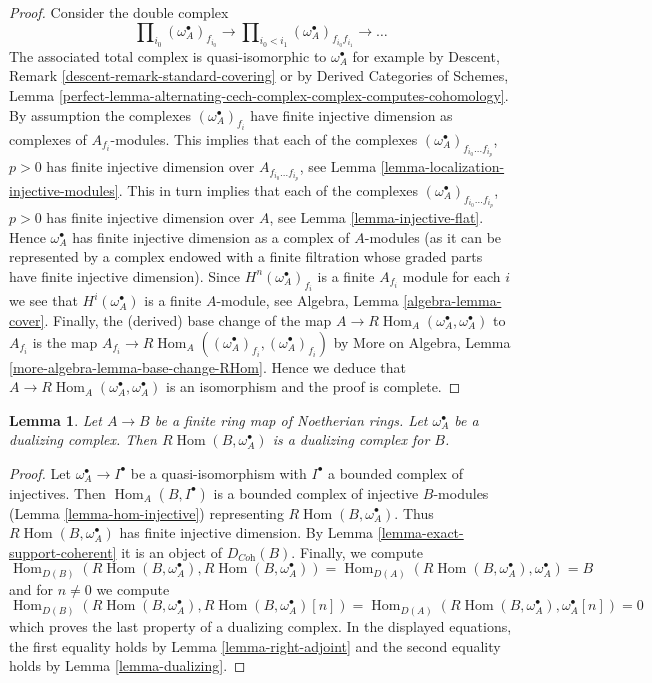 \documentclass{stacks-project}
\theoremstyle{plain}
\newtheorem{lemma}[subsection]{Lemma}
\theoremstyle{definition}
\theoremstyle{remark}
\numberwithin{equation}{subsection}
\def\Hom{\mathop{\mathrm{Hom}}\nolimits}
\begin{document}
\begin{proof}
Consider the double complex
$$
\prod\nolimits_{i_0} (\omega_A^\bullet)_{f_{i_0}}
\to
\prod\nolimits_{i_0 < i_1} (\omega_A^\bullet)_{f_{i_0}f_{i_1}}
\to \ldots
$$
The associated total complex is quasi-isomorphic to $\omega_A^\bullet$
for example by Descent, Remark \ref{descent-remark-standard-covering}
or by
Derived Categories of Schemes, Lemma
\ref{perfect-lemma-alternating-cech-complex-complex-computes-cohomology}.
By assumption the complexes $(\omega_A^\bullet)_{f_i}$ have
finite injective dimension as complexes of $A_{f_i}$-modules.
This implies that each of the complexes
$(\omega_A^\bullet)_{f_{i_0} \ldots f_{i_p}}$, $p > 0$ has
finite injective dimension over $A_{f_{i_0} \ldots f_{i_p}}$,
see Lemma \ref{lemma-localization-injective-modules}.
This in turn implies that each of the complexes
$(\omega_A^\bullet)_{f_{i_0} \ldots f_{i_p}}$, $p > 0$ has
finite injective dimension over $A$, see
Lemma \ref{lemma-injective-flat}. Hence $\omega_A^\bullet$
has finite injective dimension as a complex of $A$-modules
(as it can be represented by a complex endowed with
a finite filtration whose graded parts have finite injective
dimension). Since $H^n(\omega_A^\bullet)_{f_i}$ is a finite
$A_{f_i}$ module for each $i$ we see that $H^i(\omega_A^\bullet)$
is a finite $A$-module, see Algebra, Lemma \ref{algebra-lemma-cover}.
Finally, the (derived) base change of the map
$A \to R\Hom_A(\omega_A^\bullet, \omega_A^\bullet)$ to $A_{f_i}$
is the map
$A_{f_i} \to R\Hom_A((\omega_A^\bullet)_{f_i}, (\omega_A^\bullet)_{f_i})$ by
More on Algebra, Lemma \ref{more-algebra-lemma-base-change-RHom}.
Hence we deduce that
$A \to R\Hom_A(\omega_A^\bullet, \omega_A^\bullet)$
is an isomorphism and the proof is complete.
\end{proof}

\begin{lemma}
\label{lemma-dualizing-finite}
Let $A \to B$ be a finite ring map of Noetherian rings.
Let $\omega_A^\bullet$ be a dualizing complex.
Then $R\Hom(B, \omega_A^\bullet)$ is a dualizing complex for $B$.
\end{lemma}

\begin{proof}
Let $\omega_A^\bullet \to I^\bullet$ be a quasi-isomorphism
with $I^\bullet$ a bounded complex of injectives.
Then $\Hom_A(B, I^\bullet)$ is a bounded complex of injective
$B$-modules (Lemma \ref{lemma-hom-injective}) representing
$R\Hom(B, \omega_A^\bullet)$.
Thus $R\Hom(B, \omega_A^\bullet)$ has finite injective dimension.
By Lemma \ref{lemma-exact-support-coherent} it is an object of
$D_{\textit{Coh}}(B)$. Finally, we compute
$$
\Hom_{D(B)}(R\Hom(B, \omega_A^\bullet), R\Hom(B, \omega_A^\bullet)) =
\Hom_{D(A)}(R\Hom(B, \omega_A^\bullet), \omega_A^\bullet) = B
$$
and for $n \not = 0$ we compute
$$
\Hom_{D(B)}(R\Hom(B, \omega_A^\bullet), R\Hom(B, \omega_A^\bullet)[n]) =
\Hom_{D(A)}(R\Hom(B, \omega_A^\bullet), \omega_A^\bullet[n]) = 0
$$
which proves the last property of a dualizing complex.
In the displayed equations, the first
equality holds by Lemma \ref{lemma-right-adjoint}
and the second equality holds by Lemma \ref{lemma-dualizing}.
\end{proof}
\end{document}
